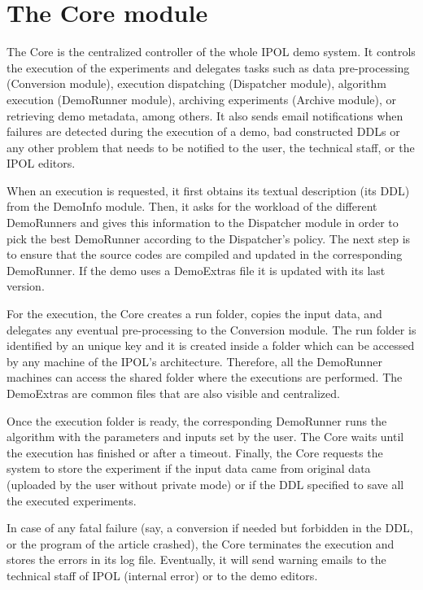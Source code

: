 \section{The Core module}
The Core is the centralized controller of the whole IPOL demo system. It controls the execution of the experiments and delegates tasks such as data pre-processing (Conversion module), execution dispatching (Dispatcher module), algorithm execution (DemoRunner module), archiving experiments (Archive module), or retrieving demo metadata, among others. It also sends email notifications when failures are detected during the execution of a demo, bad constructed DDLs or any other problem that needs to be notified to the user, the technical staff, or the IPOL editors.

When an execution is requested, it first obtains its textual description (its DDL) from the DemoInfo module. Then, it asks for the workload of the different DemoRunners and gives this information to the Dispatcher module in order to pick the best DemoRunner according to the Dispatcher's policy. The next step is to ensure that the source codes are compiled and updated in the corresponding DemoRunner. If the demo uses a DemoExtras file it is updated with its last version.

For the execution, the Core creates a run folder, copies the input data, and delegates any eventual pre-processing to the Conversion module. The run folder is identified by an unique key and it is created inside a folder which can be accessed by any machine of the IPOL's architecture. Therefore, all the DemoRunner machines can access the shared folder where the executions are performed. The DemoExtras are common files that are also visible and centralized.

Once the execution folder is ready, the corresponding DemoRunner runs the algorithm with the parameters and inputs set by the user. The Core waits until the execution has finished or after a timeout. Finally, the Core requests the system to store the experiment if the input data came from original data (uploaded by the user without private mode) or if the DDL specified to save all the executed experiments.

In case of any fatal failure (say, a conversion if needed but forbidden in the DDL, or the program of the article crashed), the Core terminates the execution and stores the errors in its log file. Eventually, it will send warning emails to the technical staff of IPOL (internal error) or to the demo editors.

